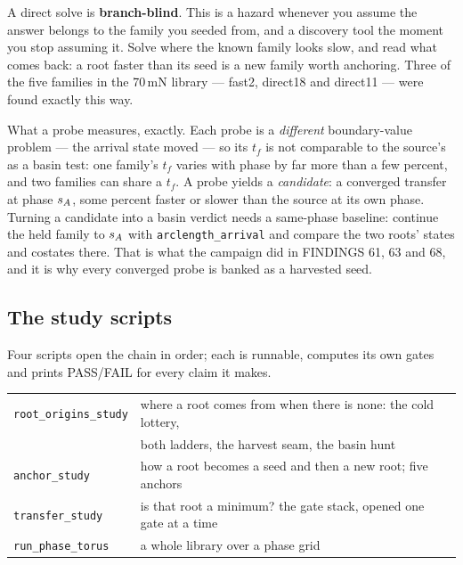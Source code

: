 \documentclass[11pt]{article}
\newcommand{\tf}{t_f}\newcommand{\R}{\mathbb{R}}
\newcommand{\file}[1]{\texttt{#1}}
\begin{document}
\begin{intu}
A direct solve is \textbf{branch-blind}. This is a hazard whenever you assume
the answer belongs to the family you seeded from, and a discovery tool the
moment you stop assuming it. Solve where the known family looks slow, and
read what comes back: a root faster than its seed is a new family worth
anchoring. Three of the five families in the 70\,mN library --- fast2,
direct18 and direct11 --- were found exactly this way.
\end{intu}

\begin{rig}
What a probe measures, exactly. Each probe is a \emph{different}
boundary-value problem --- the arrival state moved --- so its $\tf$ is not
comparable to the source's as a basin test: one family's $\tf$ varies with
phase by far more than a few percent, and two families can share a $\tf$.
A probe yields a \emph{candidate}: a converged transfer at phase $s_A$, some
percent faster or slower than the source at its own phase. Turning a
candidate into a basin verdict needs a same-phase baseline: continue the
held family to $s_A$ with \file{arclength\_arrival} and compare the two
roots' states and costates there. That is what the campaign did in FINDINGS
61, 63 and 68, and it is why every converged probe is banked as a harvested
seed.
\end{rig}

\subsection{The study scripts}

\begin{rig}
Four scripts open the chain in order; each is runnable, computes its own
gates and prints PASS/FAIL for every claim it makes.

\begin{center}\small
\begin{tabular}{@{}ll@{}}
\toprule
\file{root\_origins\_study} & where a root comes from when there is none:
the cold lottery, \\
 & both ladders, the harvest seam, the basin hunt \\
\file{anchor\_study} & how a root becomes a seed and then a new root;
five anchors \\
\file{transfer\_study} & is that root a minimum? the gate stack, opened
one gate at a time \\
\file{run\_phase\_torus} & a whole library over a phase grid \\
\bottomrule
\end{tabular}
\end{center}
\end{rig}
\end{document}
